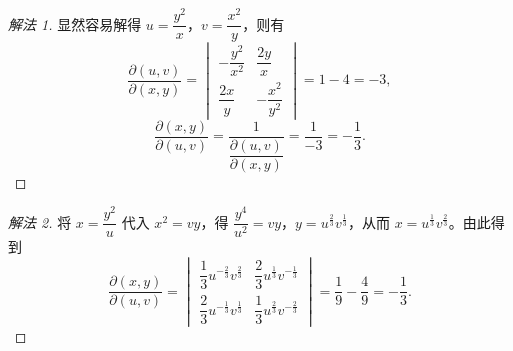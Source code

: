 \begin{proof}[解法 1]
显然容易解得 $u = \dfrac{y^{2}}{x}$，$v = \dfrac{x^{2}}{y}$，则有
\[
  \frac{\partial(u,v)}{\partial(x,y)} = \begin{vmatrix} -\dfrac{y^{2}}{x^{2}} & \dfrac{2y}{x} \\[6pt] \dfrac{2x}{y} & -\dfrac{x^{2}}{y^{2}} \end{vmatrix} = 1 - 4 = -3,
\]
\[
  \frac{\partial(x,y)}{\partial(u,v)} = \frac{1}{\dfrac{\partial(u,v)}{\partial(x,y)}} = \frac{1}{-3} = -\frac{1}{3}.
\]
\end{proof}

\begin{proof}[解法 2]
将 $x = \dfrac{y^{2}}{u}$ 代入 $x^{2} = vy$，得 $\dfrac{y^{4}}{u^{2}} = vy$，$y = u^{\frac{2}{3}}v^{\frac{1}{3}}$，从而 $x = u^{\frac{1}{3}}v^{\frac{2}{3}}$。由此得到
\[
  \frac{\partial(x,y)}{\partial(u,v)} = \begin{vmatrix} \dfrac{1}{3}u^{-\frac{2}{3}}v^{\frac{2}{3}} & \dfrac{2}{3}u^{\frac{1}{3}}v^{-\frac{1}{3}} \\[6pt] \dfrac{2}{3}u^{-\frac{1}{3}}v^{\frac{1}{3}} & \dfrac{1}{3}u^{\frac{2}{3}}v^{-\frac{2}{3}} \end{vmatrix} = \frac{1}{9} - \frac{4}{9} = -\frac{1}{3}.
\]
\end{proof}

